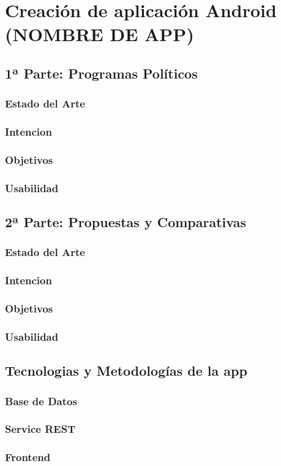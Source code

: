 \newpage
\thispagestyle{sectioned}
\chapter{Creación de aplicación Android (NOMBRE DE APP)}


\section{1ª Parte: Programas Políticos}
  \subsection{Estado del Arte}
  
  \subsection{Intencion}
  \subsection{Objetivos}
  \subsection{Usabilidad}


  
\section{2ª Parte: Propuestas y Comparativas}
  \subsection{Estado del Arte}

  \subsection{Intencion}
  \subsection{Objetivos}
  \subsection{Usabilidad}

  
  
\section{Tecnologias y Metodologías de la app}

  \subsection{Base de Datos}
  \subsection{Service REST}

  \subsection{Frontend}
